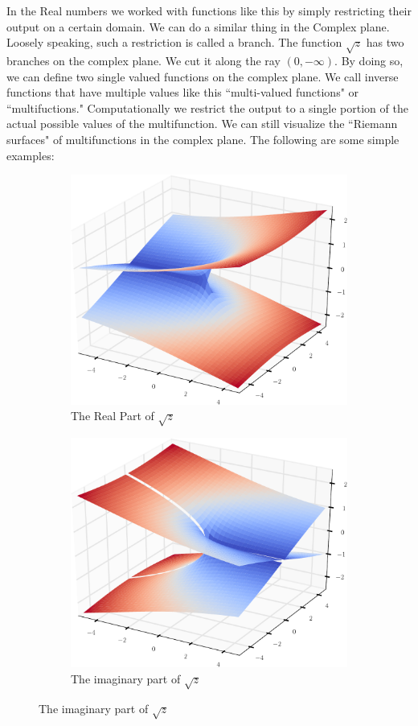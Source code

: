 In the Real numbers we worked with functions like this by simply restricting their output on a certain domain. We can do a similar thing in the Complex plane. Loosely speaking, such a restriction is called a branch. The function $\sqrt{z}$ has two branches on the complex plane. We cut it along the ray $(0,-\infty)$. By doing so, we can define two single valued functions on the complex plane. We call inverse functions that have multiple values like this ``multi-valued functions" or ``multifuctions." Computationally we restrict the output to a single portion of the actual possible values of the multifunction. We can still visualize the ``Riemann surfaces" of multifunctions in the complex plane. The following are some simple examples:
\begin{figure}[h]
\begin{subfigure}{.49\textwidth}
\includegraphics[width=\textwidth]{RiemannSurface1}
\caption{The Real Part of $\sqrt{z}$}
\end{subfigure}
\begin{subfigure}{.49\textwidth}
\includegraphics[width=\textwidth]{RiemannSurface2}
\caption{The imaginary part of $\sqrt{z}$}
\end{subfigure}
\end{figure}
